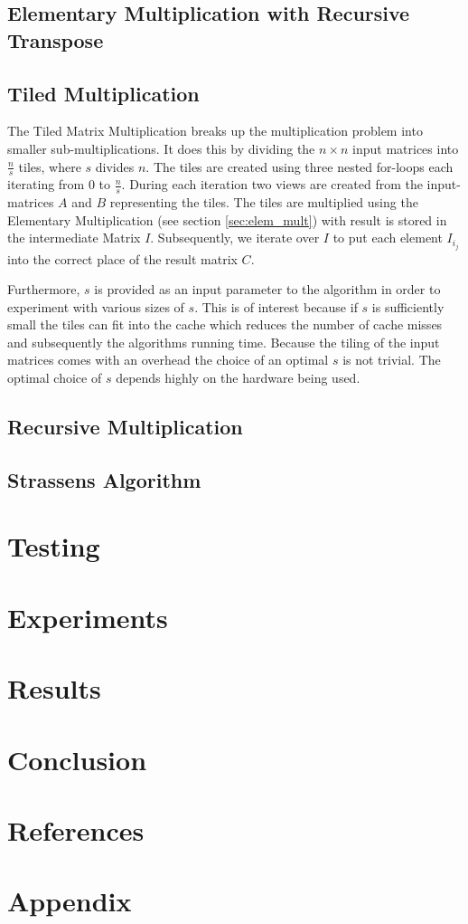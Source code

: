 \documentclass[12pt, a4paper]{article}
\begin{document}
\subsection{Elementary Multiplication with Recursive Transpose}
\label{sec:transpose}

\subsection{Tiled Multiplication}

The Tiled Matrix Multiplication breaks up the multiplication problem into smaller sub-multiplications. It does this by dividing the $n \times n$ input matrices into $\frac{n}{s}$ tiles, where $s$ divides $n$. The tiles are created using three nested for-loops each iterating from $0$ to $\frac{n}{s}$. During each iteration two views are created from the input-matrices $A$ and $B$ representing the tiles. The tiles are multiplied using the Elementary Multiplication (see section \ref{sec:elem_mult}) with result is stored in the intermediate Matrix $I$. Subsequently, we iterate over $I$ to put each element $I_i_j$ into the correct place of the result matrix $C$.

Furthermore, $s$ is provided as an input parameter to the algorithm in order to experiment with various sizes of $s$. This is of interest because if $s$ is sufficiently small the tiles can fit into the cache which reduces the number of cache misses and subsequently the algorithms running time. Because the tiling of the input matrices comes with an overhead the choice of an optimal $s$ is not trivial. The optimal choice of $s$ depends highly on the hardware being used.

\subsection{Recursive Multiplication}

\subsection{Strassens Algorithm}

\section{Testing}

\section{Experiments}

\section{Results}

\section{Conclusion}

\section{References}

\section{Appendix}
\end{document}
